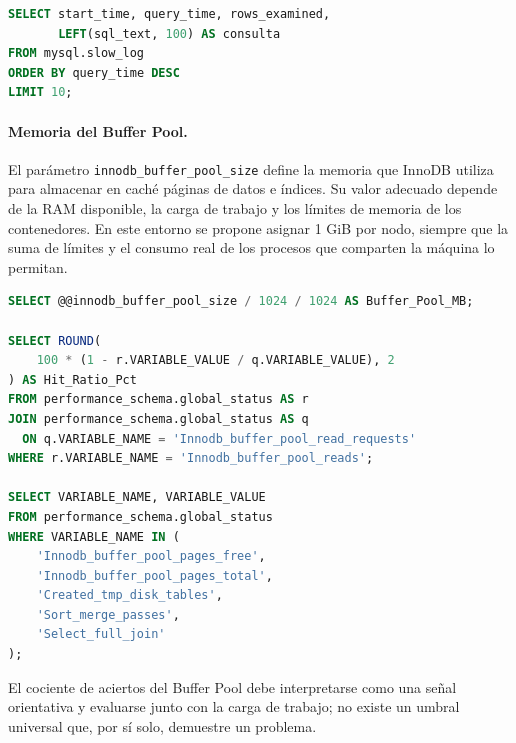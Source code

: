 \documentclass[10pt,a4paper]{article}
\begin{document}
\begin{lstlisting}[language=SQL, caption={Consulta ilustrativa de las consultas lentas}]
SELECT start_time, query_time, rows_examined,
       LEFT(sql_text, 100) AS consulta
FROM mysql.slow_log
ORDER BY query_time DESC
LIMIT 10;
\end{lstlisting}

\paragraph{Memoria del Buffer Pool.}
El parámetro \texttt{innodb\_buffer\_pool\_size} define la memoria que InnoDB utiliza para almacenar en caché páginas de datos e índices. Su valor adecuado depende de la RAM disponible, la carga de trabajo y los límites de memoria de los contenedores. En este entorno se propone asignar 1 GiB por nodo, siempre que la suma de límites y el consumo real de los procesos que comparten la máquina lo permitan.

\begin{lstlisting}[language=SQL, caption={Tamaño y métricas del Buffer Pool}]
SELECT @@innodb_buffer_pool_size / 1024 / 1024 AS Buffer_Pool_MB;

SELECT ROUND(
    100 * (1 - r.VARIABLE_VALUE / q.VARIABLE_VALUE), 2
) AS Hit_Ratio_Pct
FROM performance_schema.global_status AS r
JOIN performance_schema.global_status AS q
  ON q.VARIABLE_NAME = 'Innodb_buffer_pool_read_requests'
WHERE r.VARIABLE_NAME = 'Innodb_buffer_pool_reads';

SELECT VARIABLE_NAME, VARIABLE_VALUE
FROM performance_schema.global_status
WHERE VARIABLE_NAME IN (
    'Innodb_buffer_pool_pages_free',
    'Innodb_buffer_pool_pages_total',
    'Created_tmp_disk_tables',
    'Sort_merge_passes',
    'Select_full_join'
);
\end{lstlisting}

El cociente de aciertos del Buffer Pool debe interpretarse como una señal orientativa y evaluarse junto con la carga de trabajo; no existe un umbral universal que, por sí solo, demuestre un problema.
\end{document}
